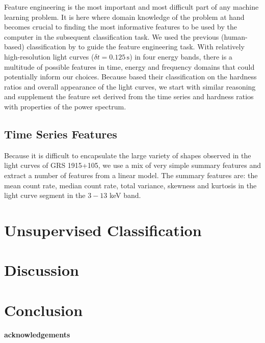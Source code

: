 \documentclass[12pt]{emulateapj}
\begin{document}
Feature engineering is the most important and most difficult part of any machine learning problem. It is here where domain knowledge of the problem at hand becomes crucial to finding the most informative features to be used by the computer in the subsequent classification task. 
We used the previous (human-based) classification by \citet{belloni2000} to guide the feature engineering task. With relatively high-resolution light curves ($\delta t = 0.125 \,\mathrm{s}$) in four energy bands, there is a multitude of possible features in time, energy and frequency domains that could potentially inform our choices. Because \citet{belloni2000} based their classification on the hardness ratios and overall appearance of the light curves, we start with similar reasoning and supplement the feature set derived from the time series and hardness ratios with properties of the power spectrum. 

\subsection{Time Series Features}

Because it is difficult to encapsulate the large variety of shapes observed in the light curves of GRS 1915+105, we use a mix of very simple summary features and extract a number of features from a linear model. The summary features are: the mean count rate, median count rate, total variance, skewness and kurtosis in the light curve segment in the $3 - 13$ keV band. 



\section{Unsupervised Classification}


\section{Discussion}


\section{Conclusion}

\paragraph{acknowledgements}

%
%
\end{document}

